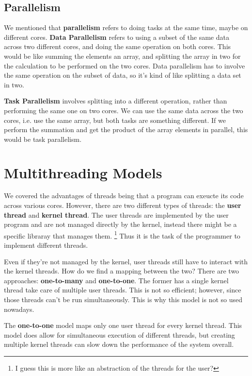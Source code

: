 \documentclass{tufte-handout}
\begin{document}
\subsection{Parallelism}
We mentioned that \textbf{parallelism} refers to doing tasks at the same time,
maybe on different cores. \textbf{Data Parallelism} refers to using a subset of the
same data across two different cores, and doing the same operation on both cores. 
This would be like summing the elements an array, and splitting the array in two 
for the calculation to be performed on the two cores. Data parallelism has to 
involve the same operation on the subset of data, so it's kind of like splitting 
a data set in two.

\textbf{Task Parallelism} involves splitting into a different operation, rather than
performing the same one on two cores. We can use the same data across the two cores,
i.e. use the same array, but both tasks are something different. If we perform the 
summation and get the product of the array elements in parallel, this would be 
task parallelism.

\section{Multithreading Models} We covered the advantages of threads being that a program can exeucte its code across various
cores. However, there are two different types of threads: the \textbf{user thread} and 
\textbf{kernel thread}. The user threads are implemented by the user program and are not 
managed directly by the kernel, instead there might be a specific libraray that manages them. 
\footnote{I guess this is more like an abstraction of the threads for the user?} Thus it is 
the task of the programmer to implement different threads.

Even if they're not managed by the kernel, user threads still have to interact with the 
kernel threads. How do we find a mapping between the two? There are two approaches:
\textbf{one-to-many} and \textbf{one-to-one}. The former has a single kernel thread take care
of multiple user threads. This is not so efficient; however, since those threads can't be 
run simultaneously. This is why this model is not so used nowadays.

The \textbf{one-to-one} model maps only one user thread for every kernel thread. This model
does allow for simultaneous execution of different threads, but creating multiple kernel
threads can slow down the performance of the system overall.
\end{document}
